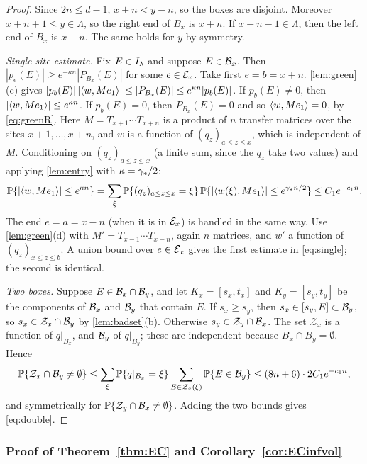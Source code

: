 \begin{proof}
Since $2n\le d-1$, $x+n<y-n$, so the boxes are disjoint.  Moreover $x+n+1\le y\in\Lambda$, so the right
end of $B_x$ is $x+n$.  If $x-n-1\in\Lambda$, then the left end of $B_x$ is $x-n$.  The same holds for $y$
by symmetry.

\emph{Single-site estimate.}  Fix $E\in I_\lambda$ and suppose $E\in\mathcal{B}_x$.  Then
$|p_e(E)|\ge e^{-\kappa n}|P_{B_x}(E)|$ for some $e\in\mathcal{E}_x$.  Take first $e=b=x+n$.
\cref{lem:green}(c) gives $|p_b(E)|\,|\langle w,Me_1\rangle|\le|P_{B_x}(E)|\le e^{\kappa n}|p_b(E)|$.  If
$p_b(E)\neq0$, then $|\langle w,Me_1\rangle|\le e^{\kappa n}$.  If $p_b(E)=0$, then $P_{B_x}(E)=0$ and so
$\langle w,Me_1\rangle=0$, by \eqref{eq:greenR}.  Here $M=T_{x+1}\cdots T_{x+n}$ is a product of $n$
transfer matrices over the sites $x+1,\dots,x+n$, and $w$ is a function of $(q_z)_{a\le z\le x}$, which
is independent of $M$.  Conditioning on $(q_z)_{a\le z\le x}$ (a finite sum, since the $q_z$ take two
values) and applying \cref{lem:entry} with $\kappa=\gamma_*/2$:
\[
  \mathbb{P}\{|\langle w,Me_1\rangle|\le e^{\kappa n}\}
  =\sum_\xi\mathbb{P}\{(q_z)_{a\le z\le x}=\xi\}\,\mathbb{P}\{|\langle w(\xi),Me_1\rangle|\le e^{\gamma_* n/2}\}\le C_1e^{-c_1n}.
\]
The end $e=a=x-n$ (when it is in $\mathcal{E}_x$) is handled in the same way.  Use \cref{lem:green}(d) with
$M'=T_{x-1}\cdots T_{x-n}$, again $n$ matrices, and $w'$ a function of $(q_z)_{x\le z\le b}$.  A union bound
over $e\in\mathcal{E}_x$ gives the first estimate in \eqref{eq:single}; the second is identical.

\emph{Two boxes.}  Suppose $E\in\mathcal{B}_x\cap\mathcal{B}_y$, and let $K_x=[s_x,t_x]$ and $K_y=[s_y,t_y]$ be the
components of $\mathcal{B}_x$ and $\mathcal{B}_y$ that contain $E$.  If $s_x\ge s_y$, then $s_x\in[s_y,E]\subset\mathcal{B}_y$, so
$s_x\in\mathcal Z_x\cap\mathcal{B}_y$ by \cref{lem:badset}(b).  Otherwise $s_y\in\mathcal Z_y\cap\mathcal{B}_x$.  The set
$\mathcal Z_x$ is a function of $q|_{B_x}$, and $\mathcal{B}_y$ of $q|_{B_y}$; these are independent because
$B_x\cap B_y=\emptyset$.  Hence
\[
  \mathbb{P}\{\mathcal Z_x\cap\mathcal{B}_y\ne\emptyset\}\le\sum_\xi\mathbb{P}\{q|_{B_x}=\xi\}\sum_{E\in\mathcal Z_x(\xi)}\mathbb{P}\{E\in\mathcal{B}_y\}
  \le(8n+6)\cdot2C_1e^{-c_1n},
\]
and symmetrically for $\mathbb{P}\{\mathcal Z_y\cap\mathcal{B}_x\neq\emptyset\}$.  Adding the two bounds gives \eqref{eq:double}.
\end{proof}

\subsubsection{Proof of Theorem~\ref{thm:EC} and Corollary~\ref{cor:ECinfvol}}


